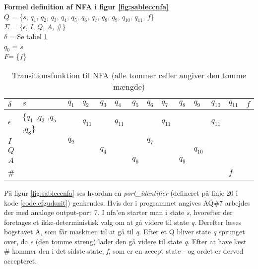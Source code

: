 \noindent \textbf{Formel definition af NFA i figur \ref{fig:sableccnfa}}\\
\noindent $Q$ = \{$s$, $q_1$, $q_2$, $q_3$, $q_4$, $q_5$, $q_6$, $q_7$, $q_8$, $q_9$, $q_{10}$, $q_{11}$, $f$\}\\
\noindent $\Sigma$ = \{$\epsilon$, $I$, $Q$, $A$, $\#$\}\\
\noindent $\delta$ = Se tabel \ref{tab:nfadelta}\\
\noindent $q_0$ = $s$\\
\noindent $F$= \{$f$\}\\


\begin{table}[H]
\centering
\footnotesize
{}
\begin{tabular}{l@{\hskip\tabcolsep\vrule width 1pt\hskip\tabcolsep}l|l|l|l|l|l|l|l|l|l|l|l|l}

$\delta$         & $s$              & $q_{1}$ & $q_{2}$ & $q_{3}$ & $q_{4}$ & $q_{5}$ & $q_{6}$ & $q_{7}$ & $q_{8}$ & $q_{9}$ & $q_{10}$ & $q_{11}$ & $f$ \\ \bottomrule
$\epsilon$ & \{$q_{1}$ ,$q_{3}$ ,$q_{5}$ ,$q_{8}$\} &   & $q_{11}$ &   & $q_{11}$ & & & $q_{11}$ & & & $q_{11}$ & &\\ 
$I$ & & $q_2$ & &       & &       & $q_7$ & &       &          & &     & \\ 
$Q$ & &       & & $q_4$ & &       &       & &       & $q_{10}$ & &     & \\ 
$A$ & &       & &       & & $q_6$ &       & & $q_9$ &          & &     & \\ 
\#  & &       & &       & &       &       & &       &          & & $f$ & \\
\end{tabular}
	\caption{Transitionsfunktion til NFA (alle tommer celler angiver den tomme mængde)}
    \label{tab:nfadelta}
\end{table}

\noindent På figur \ref{fig:sableccnfa} ses hvordan en \textit{port\_identifier} (defineret på linje 20 i kode \ref{code:cfgudsnit}) genkendes. Hvis der i programmet angives AQ\#7 arbejdes der med analoge output-port 7. I \gls{nfa}'en starter man i state \textit{s}, hvorefter der foretages et ikke-deterministisk valg om at gå videre til state  \textit{q}. Derefter læses bogstavet A, som får maskinen til at gå til \textit{q}. Efter et Q bliver state \textit{q} sprunget over, da $\epsilon$ (den tomme streng) lader den gå videre til state \textit{q}. Efter at have læst \# kommer den i det sidste state, \textit{f}, som er en accept state - og ordet er derved accepteret. \\

